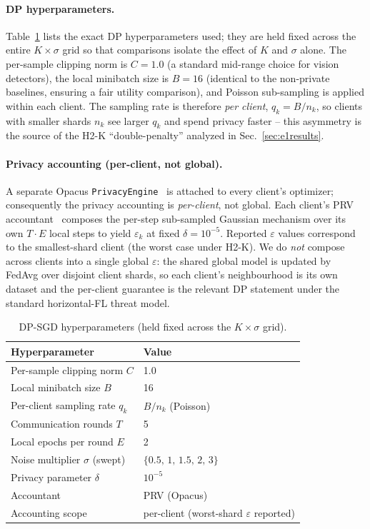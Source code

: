 \documentclass[twocolumn,a4paper,10pt]{article}
\begin{document}
\paragraph{DP hyperparameters.} Table~\ref{tab:dphyp} lists the exact DP
hyperparameters used; they are held fixed across the entire $K \times \sigma$
grid so that comparisons isolate the effect of $K$ and $\sigma$ alone. The
per-sample clipping norm is $C = 1.0$ (a standard mid-range choice for vision
detectors), the local minibatch size is $B = 16$ (identical to the non-private
baselines, ensuring a fair utility comparison), and Poisson sub-sampling is
applied within each client. The sampling rate is therefore \emph{per client},
$q_k = B / n_k$, so clients with smaller shards $n_k$ see larger $q_k$ and
spend privacy faster -- this asymmetry is the source of the H2-K
``double-penalty'' analyzed in Sec.~\ref{sec:e1results}.

\paragraph{Privacy accounting (per-client, not global).} A separate Opacus
\texttt{PrivacyEngine}~\cite{opacus2021} is attached to every client's
optimizer; consequently the privacy accounting is \emph{per-client}, not
global. Each client's PRV accountant~\cite{gopi2021} composes the per-step
sub-sampled Gaussian mechanism over its own $T \cdot E$ local steps to yield
$\varepsilon_k$ at fixed $\delta = 10^{-5}$. Reported $\varepsilon$ values
correspond to the smallest-shard client (the worst case under H2-K). We do
\emph{not} compose across clients into a single global $\varepsilon$: the
shared global model is updated by FedAvg over disjoint client shards, so each
client's neighbourhood is its own dataset and the per-client guarantee is the
relevant DP statement under the standard horizontal-FL threat model.

\begin{table}[ht]
\centering
\caption{DP-SGD hyperparameters (held fixed across the $K \times \sigma$ grid).}
\label{tab:dphyp}
\small
\setlength{\tabcolsep}{4pt}
\begin{tabular}{ll}
\toprule
\textbf{Hyperparameter} & \textbf{Value} \\
\midrule
Per-sample clipping norm $C$ & 1.0 \\
Local minibatch size $B$ & 16 \\
Per-client sampling rate $q_k$ & $B / n_k$ (Poisson) \\
Communication rounds $T$ & 5 \\
Local epochs per round $E$ & 2 \\
Noise multiplier $\sigma$ (swept) & $\{0.5,\,1,\,1.5,\,2,\,3\}$ \\
Privacy parameter $\delta$ & $10^{-5}$ \\
Accountant & PRV (Opacus) \\
Accounting scope & per-client (worst-shard $\varepsilon$ reported) \\
\bottomrule
\end{tabular}
\end{table}
\end{document}
